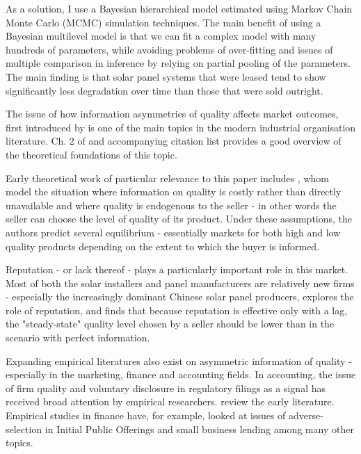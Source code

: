 \documentclass[12pt]{article}
\begin{document}
As a solution, I use a Bayesian hierarchical model estimated using Markov Chain Monte Carlo (MCMC) simulation techniques. The main benefit of using a Bayesian multilevel model is that we can fit a complex model with many hundreds of parameters, while avoiding problems of over-fitting and issues of multiple comparison in inference by relying on partial pooling of the parameters. The main finding is that solar panel systems that were leased tend to show significantly less degradation over time than those that were sold outright.

The issue of how information asymmetries of quality affects market outcomes, first introduced by \citet{akerlof_market_1970} is one of the main topics in the modern industrial organisation literature. Ch. 2 of \citet{tirole_theory_1988} and accompanying citation list provides a good overview of the theoretical foundations of this topic.

Early theoretical work of particular relevance to this paper includes \citet{chan_prices_1982}, whom model the situation where information on quality is costly rather than directly unavailable and where quality is endogenous to the seller - in other words the seller can choose the level of quality of its product. Under these assumptions, the authors predict several equilibrium - essentially markets for both high and low quality products depending on the extent to which the buyer is informed.

Reputation - or lack thereof - plays a particularly important role in this market. Most of both the solar installers and panel manufacturers are relatively new firms - especially the increasingly dominant Chinese solar panel producers,  \citet{shapiro_consumer_1982} explores the role of reputation, and finds that because reputation is effective only with a lag, the "steady-state" quality level chosen by a seller should be lower than in the scenario with perfect information.

Expanding empirical literatures also exist on asymmetric information of quality - especially in the marketing, finance and accounting fields. In accounting, the issue of firm quality and voluntary disclosure in regulatory filings as a signal has received broad attention by empirical researchers. \citet{healy_information_2001} review the early literature. Empirical studies in finance have, for example, looked at issues of adverse-selection in Initial Public Offerings \citep{michaely_pricing_1994} and small business lending \citep{petersen_benefits_1994} among many other topics.
\end{document}
